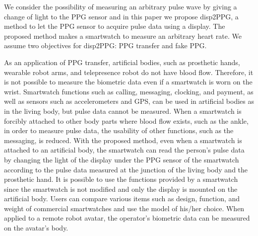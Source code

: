 \documentclass[sigchi,authordraft]{acmart}
\begin{document}

We consider the possibility of measuring an arbitrary pulse wave by giving a change of light to the PPG sensor and in this paper we propose disp2PPG, a method to let the PPG sensor to acquire pulse data using a display. The proposed method makes a smartwatch to measure an arbitrary heart rate. We assume two objectives for disp2PPG: PPG transfer and fake PPG.

As an application of PPG transfer, artificial bodies, such as prosthetic hands, wearable robot arms, and telepresence robot do not have blood flow. Therefore, it is not possible to measure the biometric data even if a smartwatch is worn on the wrist. Smartwatch functions such as calling, messaging, clocking, and payment, as well as sensors such as accelerometers and GPS, can be used in artificial bodies as in the living body, but pulse data cannot be measured. When a smartwatch is forcibly attached to other body parts where blood flow exists, such as the ankle, in order to measure pulse data, the usability of other functions, such as the messaging, is reduced.
With the proposed method, even when a smartwatch is attached to an artificial body, the smartwatch can read the person's pulse data by changing the light of the display under the PPG sensor of the smartwatch according to the pulse data measured at the junction of the living body and the prosthetic hand. It is possible to use the functions provided by a smartwatch since the smartwatch is not modified and only the display is mounted on the artificial body. Users can compare various items such as design, function, and weight of commercial smartwatches and use the model of his/her choice. When applied to a remote robot avatar, the operator's biometric data can be measured on the avatar's body.\par
\end{document}
